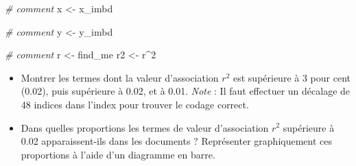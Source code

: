 \documentclass[]{article}
\newenvironment{Shaded}{\begin{snugshade}}{\end{snugshade}}
\newcommand{\KeywordTok}[1]{\textcolor[rgb]{0.13,0.29,0.53}{\textbf{#1}}}
\newcommand{\DataTypeTok}[1]{\textcolor[rgb]{0.13,0.29,0.53}{#1}}
\newcommand{\DecValTok}[1]{\textcolor[rgb]{0.00,0.00,0.81}{#1}}
\newcommand{\FloatTok}[1]{\textcolor[rgb]{0.00,0.00,0.81}{#1}}
\newcommand{\StringTok}[1]{\textcolor[rgb]{0.31,0.60,0.02}{#1}}
\newcommand{\CommentTok}[1]{\textcolor[rgb]{0.56,0.35,0.01}{\textit{#1}}}
\newcommand{\OtherTok}[1]{\textcolor[rgb]{0.56,0.35,0.01}{#1}}
\newcommand{\OperatorTok}[1]{\textcolor[rgb]{0.81,0.36,0.00}{\textbf{#1}}}
\newcommand{\NormalTok}[1]{#1}
\providecommand{\tightlist}{%
  \setlength{\itemsep}{0pt}\setlength{\parskip}{0pt}}
\begin{document}
\begin{Shaded}
\begin{Highlighting}[]
  \CommentTok{# comment}
\NormalTok{  x <-}\StringTok{ }\NormalTok{x_imbd}
  
  \CommentTok{# comment}
\NormalTok{  y <-}\StringTok{ }\NormalTok{y_imbd}
  
  \CommentTok{# comment}
\NormalTok{  r <-}\StringTok{ }\NormalTok{find_me}
\NormalTok{  r2 <-}\StringTok{ }\NormalTok{r}\OperatorTok{^}\DecValTok{2}
\end{Highlighting}
\end{Shaded}

\begin{itemize}
\tightlist
\item
  Montrer les termes dont la valeur d'association \(r^2\) est supérieure
  à 3 pour cent (0.02), puis supérieure à 0.02, et à 0.01. \emph{Note} :
  Il faut effectuer un décalage de 48 indices dans l'index pour trouver
  le codage correct.
\end{itemize}

\begin{Shaded}
\end{Shaded}

\begin{itemize}
\tightlist
\item
  Dans quelles proportions les termes de valeur d'association \(r^2\)
  supérieure à 0.02 apparaissent-ils dans les documents ? Représenter
  graphiquement ces proportions à l'aide d'un diagramme en barre.
\end{itemize}

\begin{Shaded}
\end{Shaded}
\end{document}
